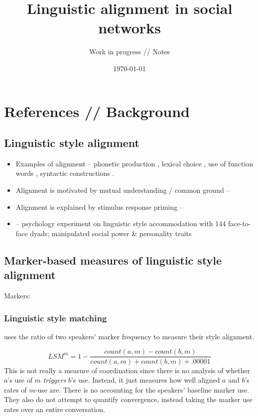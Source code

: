 \documentclass[12pt]{scrartcl}
\title{Linguistic alignment in social networks}
\subtitle{Work in progress // Notes}
\date{\today}
\begin{document}
\maketitle

\section{References // Background}

\subsection{Linguistic style alignment}
\begin{itemize}
  \item Examples of alignment -- phonetic production \citep{kim_phonetic_2011,babel_evidence_2012}, lexical choice \citep{brennan_conceptual_1996}, use of function words \citep{niederhoffer_linguistic_2002}, syntactic constructions \citep{pickering_structural_2008}. 
  \item Alignment is motivated by mutual understanding / common ground -- \cite{clark_using_1996,clark_audience_1982,brennan_conceptual_1996,brennan_partner-specific_2009}
  \item Alignment is explained by stimulus response priming --  \cite{pickering_interactive-alignment_2004,branigan_syntactic_1995,pickering_alignment_2006,reitter_alignment_2014} 
  \item{\cite{muir_characterizing_2016} -- psychology experiment on linguistic style accommodation with 144 face-to-face dyads; manipulated social power \& personality traits}
\end{itemize}

\subsection{Marker-based measures of linguistic style alignment}
Markers: \cite{tausczik_psychological_2010,niederhoffer_linguistic_2002}

\subsubsection{Linguistic style matching}

\cite{ireland_language_2011} uses the ratio of two speakers' marker frequency to measure their style alignment.

\[
LSM^m = 1 - \frac{{count(a,m) - count(b,m)}}{count(a,m) + count(b,m) + .00001}
\]
This is not really a measure of coordination since there is no analysis of whether $a$'s use of $m$ \emph{triggers} $b$'s use.
Instead, it just measures how well aligned $a$ and $b$'s rates of $m$-use are.
There is no accounting for the speakers' baseline marker use.
They also do not attempt to quantify convergence, instead taking the marker use rates over an entire conversation.
\end{document}
